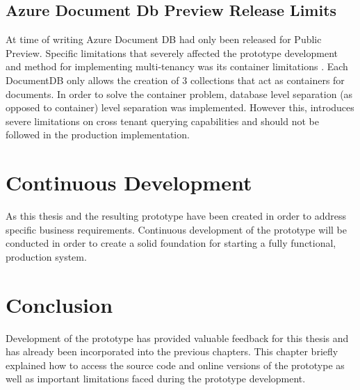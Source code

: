\subsection{Azure Document Db Preview Release Limits}
At time of writing Azure Document DB had only been released for Public Preview. Specific limitations that severely affected the prototype development and method for implementing multi-tenancy  was its container limitations \cite{AzureLimits}. Each DocumentDB only allows the creation of 3 collections that act as containers for documents. In order to solve the container problem, database level separation (as opposed to container) level separation was implemented. However this, introduces severe limitations on cross tenant querying capabilities and should not be followed in the production implementation.

\section{Continuous Development}
As this thesis and the resulting prototype have been created in order to address specific business requirements. Continuous development of the prototype will be conducted in order to create a solid foundation for starting a fully functional, production system.

\section{Conclusion}
Development of the prototype has provided valuable feedback for this thesis and has already been incorporated into the previous chapters. This chapter briefly explained how to access the source code and online versions of the prototype as well as important limitations faced during the prototype development. 
